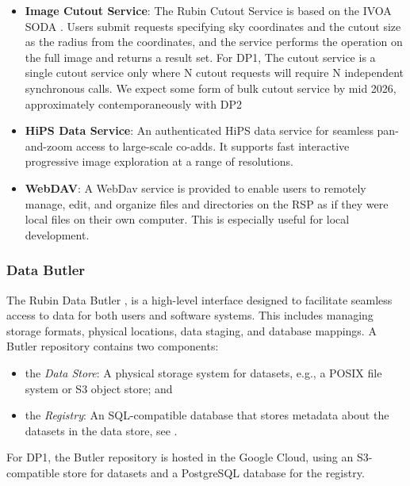 \begin{itemize}
\vspace{0.1cm}
\item \textbf{Image Cutout Service}: The Rubin Cutout Service \citep{SQR-063, SQR-093} is based on the  \gls{IVOA} SODA \citep[Server-side Operations for Data Access;][]{2017ivoa.spec.0517B}.
Users submit requests specifying sky coordinates and the cutout size as the radius from the coordinates, and the  service performs the operation on the full image and returns a result set.
For \gls{DP1}, The  cutout service is a single cutout service only where N cutout requests will require N independent synchronous calls.
We expect some form of bulk cutout service by mid 2026, approximately contemporaneously with \gls{DP2}

\vspace{0.1cm}
\item \textbf{HiPS Data Service}: An authenticated \gls{HiPS}
\citep{2017ivoa.spec.0519F}
data service for seamless pan-and-zoom access to large-scale co-adds.
It supports fast interactive progressive image exploration at a range of resolutions.

\vspace{0.1cm}
\item \textbf{WebDAV}: A \gls{WebDav} service is provided to enable users to remotely manage, edit, and organize files and directories on the \gls{RSP} as if they were local files on their own computer. This is especially useful for local development.
\end{itemize}

\subsubsection{Data Butler
\label{sssec:data_butler}}

The Rubin Data Butler \citep{2022SPIE12189E..11J,2023arXiv230303313L},  is a high-level interface designed to facilitate seamless access to data for both users and software systems.
This includes managing storage formats, physical locations, data staging, and database mappings.
A \gls{Butler} repository contains two components:
\begin{itemize}
    \item the \emph{Data Store}: A physical storage system for datasets, e.g., a \gls{POSIX} file system or S3 object store; and
    \item the \emph{Registry}: An \gls{SQL}-compatible database that stores metadata about the datasets in the data store, see .
\end{itemize}
For DP1, the Butler repository is hosted in the Google Cloud, using an \gls{S3}-compatible store for datasets and a PostgreSQL database for the registry.

